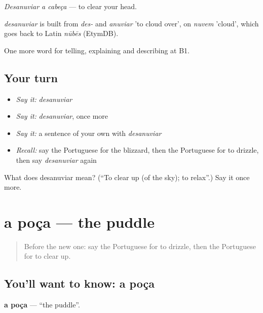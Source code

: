 \emph{Desanuviar a cabeça} — to clear your head.

\begin{cousinweb}
\emph{desanuviar} is built from \emph{des-} and \emph{anuviar} 'to cloud over', on \emph{nuvem} 'cloud', which goes back to Latin \emph{nūbēs} (EtymDB).
\end{cousinweb}

\begin{grammarlens}[title={What you've built}]
One more word for telling, explaining and describing at B1.
\end{grammarlens}

\subsection*{Your turn}
\begin{itemize}
\raggedright
  \item \emph{Say it:} \emph{desanuviar}
  \item \emph{Say it:} \emph{desanuviar}, once more
  \item \emph{Say it:} a sentence of your own with \emph{desanuviar}
  \item \emph{Recall:} say the Portuguese for the blizzard, then the Portuguese for to drizzle, then say \emph{desanuviar} again
\end{itemize}

\begin{tcolorbox}[breakable,colback=teal!4,colframe=teal!35!black,title={Before you move on}]
What does desanuviar mean? (\textquotedblleft{}To clear up (of the sky); to relax\textquotedblright{}.) Say it once more.
\end{tcolorbox}
\section[a poça]{a poça — the puddle}

\label{lesson:PT-C466-poca}



\begin{quote}
Before the new one: say the Portuguese for to drizzle, then the Portuguese for to clear up.
\end{quote}

\subsection*{You'll want to know: a poça}
\textbf{a poça} — \textquotedblleft{}the puddle\textquotedblright{}.

